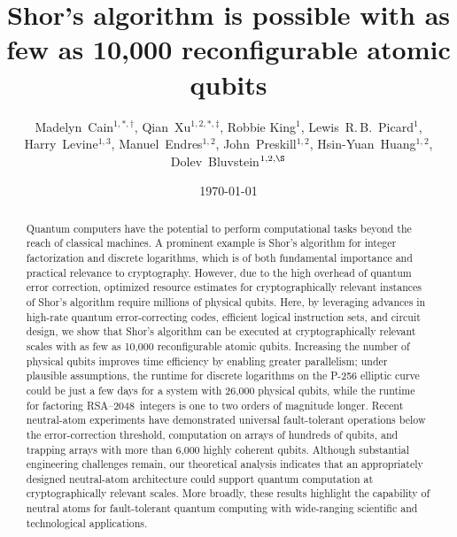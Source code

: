 \documentclass[reprint,twocolumn,secnumarabic,amssymb, aps, prx]{revtex4-2}
\newcommand{\rsa}{\mbox{RSA--2048}}
\begin{document}
\title{Shor's algorithm is possible with as few as 10,000 reconfigurable atomic qubits}

\author{
Madelyn~Cain$^{1,*, \dagger}$, 
Qian~Xu$^{1, 2,*, \ddagger}$, 
Robbie King$^{1}$, 
Lewis~R.\,B.~Picard$^{1}$, 
Harry~Levine$^{1, 3}$, 
Manuel~Endres$^{1, 2}$, 
John~Preskill$^{1, 2}$, 
Hsin-Yuan~Huang$^{1, 2}$, 
Dolev~Bluvstein$^{1,2,\S}$
}


\date{\today}

\begin{abstract}
Quantum computers have the potential to perform computational tasks beyond the reach of classical machines. A prominent example is Shor’s algorithm for integer factorization and discrete logarithms, which is of both fundamental importance and practical relevance to cryptography. However, due to the high overhead of quantum error correction, optimized resource estimates for cryptographically relevant instances of Shor’s algorithm require millions of physical qubits. Here, by leveraging advances in high-rate quantum error-correcting codes, efficient logical instruction sets, and circuit design, we show that Shor's algorithm can be executed at cryptographically relevant scales with as few as 10,000 reconfigurable atomic qubits. Increasing the number of physical qubits improves time efficiency by enabling greater parallelism; under plausible assumptions, the runtime for discrete logarithms on the P-256 elliptic curve could be just a few days for a system with 26,000 physical qubits, while the runtime for factoring \rsa\ integers is one to two orders of magnitude longer. Recent neutral-atom experiments have demonstrated universal fault-tolerant operations below the error-correction threshold, computation on arrays of hundreds of qubits, and trapping arrays with more than 6,000 highly coherent qubits. Although substantial engineering challenges remain, our theoretical analysis indicates that an appropriately designed neutral-atom architecture could support quantum computation at cryptographically relevant scales. More broadly, these results highlight the capability of neutral atoms for fault-tolerant quantum computing with wide-ranging scientific and technological applications. 
\end{abstract}
\end{document}
